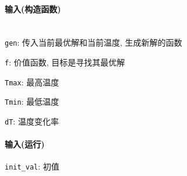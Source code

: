 \paragraph{输入(构造函数)}~\\

\verb|gen|: 传入当前最优解和当前温度, 生成新解的函数

\verb|f|: 价值函数, 目标是寻找其最优解

\verb|Tmax|: 最高温度

\verb|Tmin|: 最低温度

\verb|dT|: 温度变化率

\paragraph{输入(运行)}

\verb|init_val|: 初值
